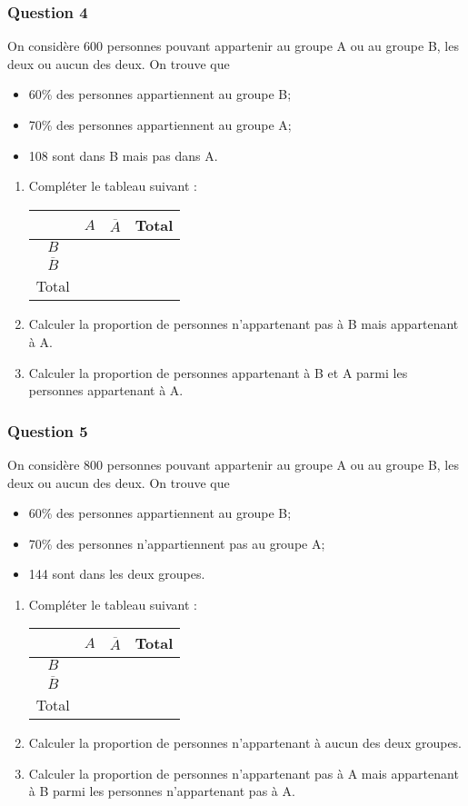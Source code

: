 \documentclass[15pt, mathserif]{beamer}
\begin{document}
\begin{frame} 
	\frametitle{Question 4}
On considère 600 personnes pouvant appartenir au groupe A ou au groupe B, les deux ou aucun des deux. On trouve que 
 \begin{itemize} 
 \item 60\%  des personnes appartiennent au groupe B; 
 \item 70\% des personnes appartiennent au groupe A; 
 \item 108 sont dans B mais pas dans A.
 \end{itemize} 
 \begin{enumerate} 
 \item Compléter le tableau suivant : 
 \hfil \begin{tabular}{|c|c|c|c|} 
 \cline{2-4}   
 \multicolumn{1}{c|}{} & $A$ & $\overline{A}$ & Total\\ \hline 
 $B$  &    & &   \\\hline 
 $\overline{B}$   &  &    &    \\\hline	
 Total   & &  &  \\\hline  
 \end{tabular} 
 \item Calculer la proportion de personnes n'appartenant pas à B mais appartenant à A. 
 \item Calculer la proportion de personnes appartenant à B et A parmi les personnes appartenant à A. 
  \end{enumerate} 
 \end{frame}


\begin{frame} 
	\frametitle{Question 5}
On considère 800 personnes pouvant appartenir au groupe A ou au groupe B, les deux ou aucun des deux. On trouve que 
 \begin{itemize} 
 \item 60\%  des personnes appartiennent au groupe B; 
 \item 70\% des personnes n'appartiennent pas au groupe A; 
 \item 144 sont dans les deux groupes.
 \end{itemize} 
 \begin{enumerate} 
 \item Compléter le tableau suivant : 
 \hfil \begin{tabular}{|c|c|c|c|} 
 \cline{2-4}   
 \multicolumn{1}{c|}{} & $A$ & $\overline{A}$ & Total\\ \hline 
 $B$  &    & &   \\\hline 
 $\overline{B}$   &  &    &    \\\hline	
 Total   & &  &  \\\hline  
 \end{tabular} 
 \item Calculer la proportion de personnes n'appartenant à aucun des deux groupes. 
 \item Calculer la proportion de personnes n'appartenant pas à A mais appartenant à B parmi les personnes n'appartenant pas à A. 
  \end{enumerate} 
 \end{frame}
\end{document}
